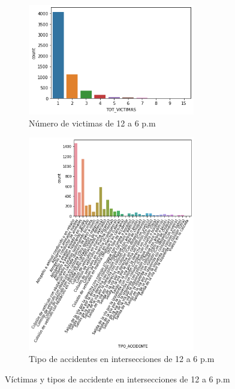 \begin{figure}[H]
\begin{subfigure}{.5\textwidth}
  \centering
  \includegraphics[width=0.8\textwidth]{imagenes/victimas_caso2-op.png}
  \caption{Número de victimas de 12 a 6 p.m}
  \label{fig:sfig1}
\end{subfigure}%
\begin{subfigure}{.5\textwidth}
  \centering
  \includegraphics[width=0.8\textwidth]{imagenes/tipo_accidente_caso2-op.png}
  \caption{Tipo de accidentes en intersecciones de 12 a 6 p.m}
  \label{fig:sfig2}
\end{subfigure}
\caption{Víctimas y tipos de accidente en intersecciones de 12 a 6 p.m}
\label{fig:fig}
\end{figure}

